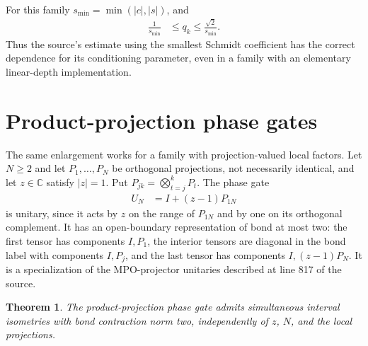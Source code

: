 \documentclass[11pt]{article}
\newtheorem{theorem}{Theorem}
\begin{document}
For this family $s_{\min}=\min(|c|,|s|)$, and
\begin{align}
 \frac{1}{s_{\min}}&\leq q_k\leq\frac{\sqrt2}{s_{\min}}.
\end{align}
Thus the source's estimate using the smallest Schmidt coefficient has the
correct dependence for its conditioning parameter, even in a family with
an elementary linear-depth implementation.

\section{Product-projection phase gates}

The same enlargement works for a family with projection-valued local
factors. Let $N\geq2$ and let $P_1,\ldots,P_N$ be orthogonal projections, not necessarily
identical, and let $z\in\mathbb C$ satisfy $|z|=1$. Put
$P_{jk}=\bigotimes_{t=j}^k P_t$. The phase gate
\begin{align}
 U_N&=I+(z-1)P_{1N}
\end{align}
is unitary, since it acts by $z$ on the range of $P_{1N}$ and by one on its
orthogonal complement. It has an open-boundary representation of bond at
most two: the first tensor has components $I,P_1$, the interior tensors are
diagonal in the bond label with components $I,P_j$, and the last tensor
has components $I,(z-1)P_N$. It is a specialization of the MPO-projector
unitaries described at line 817 of the source.

\begin{theorem}\label{thm:projection-frames}
The product-projection phase gate admits simultaneous interval isometries
with bond contraction norm two, independently of $z$, $N$, and the local
projections.
\end{theorem}
\end{document}
